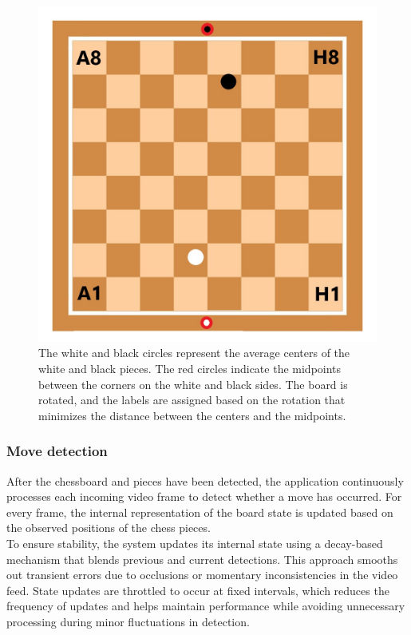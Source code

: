 \begin{figure}[h!]
\centering
\includegraphics[width=0.70\linewidth]{figures/methods/ml-models/label_assignment_board.jpg}
\caption[S]{The white and black circles represent the average centers of the white and black pieces. The red circles indicate the midpoints between the corners on the white and black sides. The board is rotated, and the labels are assigned based on the rotation that minimizes the distance between the centers and the midpoints.}
\label{fig:board_label_assignment}
\end{figure}


\subsubsection*{Move detection}

After the chessboard and pieces have been detected, the application continuously processes each incoming video frame to detect whether a move has occurred. For every frame, the internal representation of the board state is updated based on the observed positions of the chess pieces. \\

To ensure stability, the system updates its internal state using a decay-based mechanism that blends previous and current detections. This approach smooths out transient errors due to occlusions or momentary inconsistencies in the video feed. State updates are throttled to occur at fixed intervals, which reduces the frequency of updates and helps maintain performance while avoiding unnecessary processing during minor fluctuations in detection. \\

